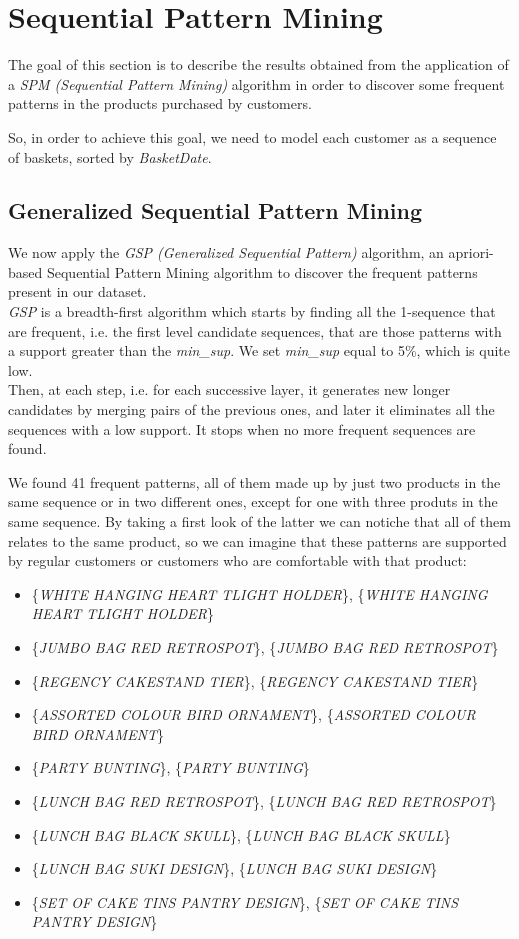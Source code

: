 \section{Sequential Pattern Mining}
The goal of this section is to describe the results obtained from the application of a \emph{SPM (Sequential Pattern Mining)} algorithm in order to discover some frequent patterns in the products purchased by customers.

So, in order to achieve this goal, we need to model each customer as a sequence of baskets, sorted by \emph{BasketDate}.

\subsection{Generalized Sequential Pattern Mining}
We now apply the \emph{GSP (Generalized Sequential Pattern)} algorithm, an apriori-based Sequential Pattern Mining algorithm to discover the frequent patterns present in our dataset.\\
\emph{GSP} is a breadth-first algorithm which starts by finding all the 1-sequence that are frequent, i.e. the first level candidate sequences, that are those patterns with a support greater than the \emph{min\_sup}. We set \emph{min\_sup} equal to 5\%, which is quite low.\\
Then, at each step, i.e. for each successive layer, it generates new longer candidates by merging pairs of the previous ones, and later it eliminates all the sequences with a low support. It stops when no more frequent sequences are found.

We found 41 frequent patterns, all of them made up by just two products in the same sequence or in two different ones, except for one with three produts in the same sequence. By taking a first look of the latter we can notiche that all of them relates to the same product, so we can imagine that these patterns are supported by regular customers or customers who are comfortable with that product:

\begin{itemize}
\item \{\emph{WHITE HANGING HEART TLIGHT HOLDER}\}, \{\emph{WHITE HANGING HEART TLIGHT HOLDER}\}
\item \{\emph{JUMBO BAG RED RETROSPOT}\}, \{\emph{JUMBO BAG RED RETROSPOT}\}
\item \{\emph{REGENCY CAKESTAND TIER}\}, \{\emph{REGENCY CAKESTAND TIER}\}
\item \{\emph{ASSORTED COLOUR BIRD ORNAMENT}\}, \{\emph{ASSORTED COLOUR BIRD ORNAMENT}\}
\item \{\emph{PARTY BUNTING}\}, \{\emph{PARTY BUNTING}\}
\item \{\emph{LUNCH BAG RED RETROSPOT}\}, \{\emph{LUNCH BAG RED RETROSPOT}\}
\item \{\emph{LUNCH BAG BLACK SKULL}\}, \{\emph{LUNCH BAG BLACK SKULL}\}
\item \{\emph{LUNCH BAG SUKI DESIGN}\}, \{\emph{LUNCH BAG SUKI DESIGN}\}
\item \{\emph{SET OF CAKE TINS PANTRY DESIGN}\}, \{\emph{SET OF CAKE TINS PANTRY DESIGN}\}
\end{itemize}

